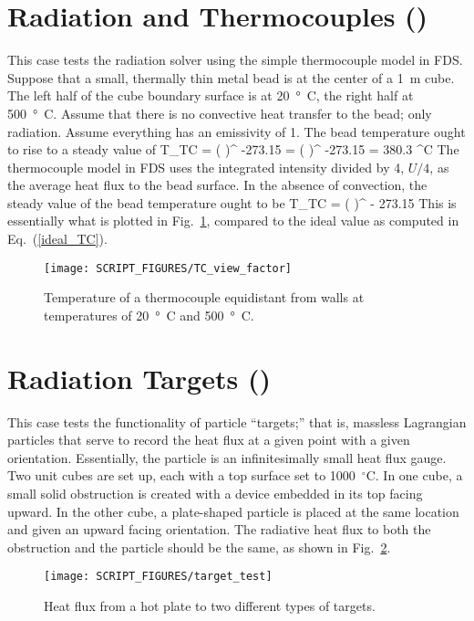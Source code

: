 \documentclass[11pt]{book}
\begin{document}
\section{Radiation and Thermocouples (\texorpdfstring{}{TC\_view\_factor}) }
\label{TC_view_factor}

This case tests the radiation solver using the simple thermocouple model in FDS.  Suppose that a small, thermally thin metal bead is at the center of a 1~m cube. The left half of the cube boundary surface is at 20~\si{\degree C}, the right half at 500~\si{\degree C}. Assume that there is no convective heat transfer to the bead; only radiation. Assume everything has an emissivity of 1. The bead temperature ought to rise to a steady value of
\be
   T_{\hbox{\tiny TC}} = \left(  \right)^ -273.15 = \left(  \right)^ -273.15 = 380.3 \quad ^\circ \hbox{C}
   \label{ideal_TC}
\ee
The thermocouple model in FDS uses the integrated intensity divided by 4, $U/4$, as the average heat flux to the bead surface. In the absence of convection, the steady value of the bead temperature ought to be
\be
   T_{\hbox{\tiny TC}} = \left(  \right)^ - 273.15
\ee
This is essentially what is plotted in Fig.~\ref{TC_view_factor_plot}, compared to the ideal value as computed in Eq.~(\ref{ideal_TC}).
\begin{figure}[ht]
\centering
\texttt{[image: SCRIPT\_FIGURES/TC\_view\_factor]}
\caption[Radiation/thermocouple test case]{Temperature of a thermocouple equidistant from walls at temperatures of 20~\si{\degree C} and 500~\si{\degree C}.}
\label{TC_view_factor_plot}
\end{figure}



\section{Radiation Targets (\texorpdfstring{}{target\_test}) }
\label{target_test}

This case tests the functionality of particle ``targets;'' that is, massless Lagrangian particles that serve to record the heat flux at a given point with a given orientation. Essentially, the particle is an infinitesimally small heat flux gauge. Two unit cubes are set up, each with a top surface set to 1000~$^\circ$C. In one cube, a small solid obstruction is created with a device embedded in its top facing upward. In the other cube, a plate-shaped particle is placed at the same location and given an upward facing orientation. The radiative heat flux to both the obstruction and the particle should be the same, as shown in Fig.~\ref{target_test_plot}.
\begin{figure}[ht]
\centering
\texttt{[image: SCRIPT\_FIGURES/target\_test]}
\caption[The  case]{Heat flux from a hot plate to two different types of targets.}
\label{target_test_plot}
\end{figure}
\end{document}
